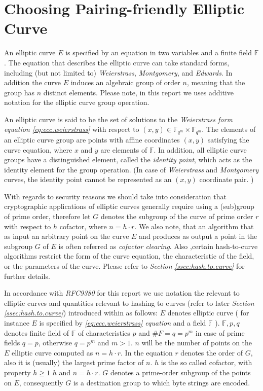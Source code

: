 \section{Choosing Pairing-friendly Elliptic Curve}
\label{sec:apx.ecc.curves}

An elliptic curve $E$ is specified by an equation in two variables and
a finite field $\mathbb{F}$. The equation that describes the elliptic curve 
can take standard forms, including (but not limited to) \textit{Weierstrass},
\textit{Montgomery}, and \textit{Edwards}. In addition the curve $E$ induces an algebraic group of order $n$, meaning that the group has $n$ distinct elements. \cite{ecc.hashing} Please note, in this report we uses additive notation
for the elliptic curve group operation.

An elliptic curve is said to be the set of solutions to the \textit{Weierstrass form}
\textit{equation \ref{eq:ecc.weierstrass}} with respect to
$(x,y) \in \mathbb{F}_{q^m} \times \mathbb{F}_{q^m}$.\cite{ecc.fam.param}  The elements of an elliptic curve group are points with affine coordinates $(x, y)$ satisfying the curve equation, where $x$ and $y$ are elements of $\mathbb{F}$.  In addition, all elliptic curve groups have a distinguished element, called the \textit{identity
point}, which acts as the identity element for the group operation.
(In case of \textit{Weierstrass} and \textit{Montgomery} curves, the
identity point cannot be represented as an $(x, y)$ coordinate pair.
)\cite{ecc.hashing}

With regards to security reasons we should take into consideration that cryptographic applications of elliptic curves generally require using a (sub)group of prime order, therefore let $G$ denotes the subgroup of the curve of prime order $r$ with respect to $h$ cofactor, where $n = h \cdot r$. We also note, that an algorithm that 
as input an arbitrary point on the curve $E$ and produces as output a point in the subgroup $G$ of $E$ is often referred as \textit{cofactor clearing}. Also ,certain hash-to-curve algorithms restrict the form of the curve equation, the characteristic of the field, or the parameters of the curve.\cite{ecc.hashing} Please refer to \textit{Section \ref{ssec:hash.to.curve}} for further details.

In accordance with \textit{RFC9380} for this report we use notation the relevant to elliptic curves and quantities relevant to hashing to curves (refer to later \textit{Section \ref{ssec:hash.to.curve}}) introduced within \cite{ecc.hashing} as follows:
$E$ denotes elliptic curve ( for instance $E$ is specified by \textit{\ref{eq:ecc.weierstrass} equation} and a field $\mathbb{F}$ ). 
 $\mathbb{F},p,q$ denotes finite field of $\mathbb{F}$ of characteristics $p$ and $\#F= q = p^m$ in case of prime fields $q=p$, otherwise $q = p^m$ and $m>1$. $n$  will be the number of points on the $E$ elliptic curve computed as  $n= h \cdot r$. In the equation $r$ denotes the order of $G$, also it is (usually) the largest prime factor of $n$. $h$ is the so called cofactor, with property $h \geq 1$ $h$ and $n = h \cdot r$. $G$ denotes a prime-order subgroup of the points on $E$, consequently $G$ is a destination group to which byte strings are encoded.  \cite{ecc.hashing}

